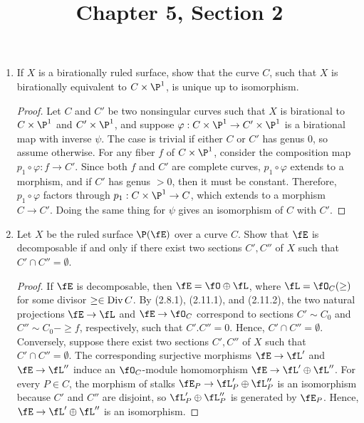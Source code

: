 \documentclass[a4paper]{article}
\title{Chapter 5, Section 2}
\begin{document}
\maketitle

\begin{enumerate} [label=\textbf{\arabic*.}, leftmargin=0em]


    \item If $X$ is a birationally ruled surface, show that the curve $C$, such that $X$ is birationally equivalent to $C \times \P^1$, is unique up to isomorphism.

          \begin{proof}
              Let $C$ and $C'$ be two nonsingular curves such that $X$ is birational to $C \times \P^1$ and $C' \times \P^1$, and suppose $\varphi : C \times \P^1 \to C' \times \P^1$ is a birational map with inverse $\psi$.
              The case is trivial if either $C$ or $C'$ has genus 0, so assume otherwise.
              For any fiber $f$ of $C \times \P^1$, consider the composition map $p_1 \circ \varphi : f \to C'$.
              Since both $f$ and $C'$ are complete curves, $p_1 \circ \varphi$ extends to a morphism, and if $C'$ has genus $> 0$, then it must be constant.
              Therefore, $p_1 \circ \varphi$ factors through $p_1 : C \times \P^1 \to C$, which extends to a morphism $C \to C'$.
              Doing the same thing for $\psi$ gives an isomorphism of $C$ with $C'$.
          \end{proof}

    \item Let $X$ be the ruled surface $\P(\fE)$ over a curve $C$.
          Show that $\fE$ is decomposable if and only if there exist two sections $C', C''$ of $X$ such that $C' \cap C'' = \emptyset$.

          \begin{proof}
              If $\fE$ is decomposable, then $\fE = \fO \oplus \fL$, where $\fL = \fO_C(\ge)$ for some divisor $\ge \in \operatorname{Div}{C}$.
              By (2.8.1), (2.11.1), and (2.11.2), the two natural projections $\fE \to \fL$ and $\fE \to \fO_C$ correspond to sections $C' \sim C_0$ and $C'' \sim C_0 - \ge f$, respectively, such that $C'.C'' = 0$.
              Hence, $C' \cap C'' = \emptyset$.
              Conversely, suppose there exist two sections $C', C''$ of $X$ such that $C' \cap C'' = \emptyset$.
              The corresponding surjective morphisms $\fE \to \fL'$ and $\fE \to \fL''$ induce an $\fO_C$-module homomorphism $\fE \to \fL' \oplus \fL''$.
              For every $P \in C$, the morphism of stalks $\fE_P \to \fL'_P \oplus \fL''_P$ is an isomorphism because $C'$ and $C''$ are disjoint, so $\fL'_P \oplus \fL''_P$ is generated by $\fE_P$.
              Hence, $\fE \to \fL' \oplus \fL''$ is an isomorphism.
          \end{proof}


\end{enumerate}
\end{document}
